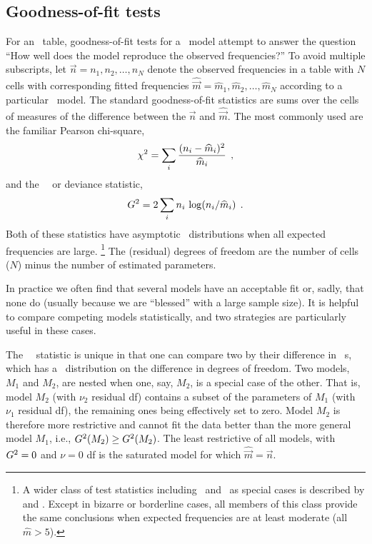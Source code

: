 \subsection{Goodness-of-fit tests} \label{sec:loglin-goodfit}

For an \nway\ table, goodness-of-fit tests for a \loglin\ model
attempt to answer the question ``How well does the model reproduce
the observed frequencies?''
To avoid multiple subscripts, let $\vec{n} = n_1, n_2, \ldots , n_N$ denote
the observed frequencies in a table with $N$ cells
with corresponding fitted frequencies
$\widehat{\vec{m}} = \widehat{m}_1, \widehat{m}_2, \ldots , \widehat{m}_N$
according to a particular \loglin\ model.
The standard goodness-of-fit statistics are sums over the cells
of measures of the difference between the $\vec{n}$ and $\widehat{\vec{m}}$.
The most commonly used are the familiar Pearson chi-square,
\begin{equation*}%
\chisq = \sum_i \frac{( n_i - \widehat{m}_i )^2}{\widehat{m}_i}
\comma
\end{equation*}
and the \LR\ \GSQ\ or deviance statistic,
\begin{equation}\label{eq:pgsq}
G^2 =  2 \sum_i n_i \, \log ( n_i / \widehat{m}_i )
\:\: .
\end{equation}
Both of these statistics have asymptotic \chisq\
distributions when all expected frequencies are large.%
\footnote{A wider class of test statistics including \chisq\
and \GSQ\ as special cases is
described by \citet{CressieRead:84} and \citet{ReadCressie:88}.
Except in bizarre or borderline
cases, all members of this class provide the same conclusions when 
expected frequencies are at least moderate (all $\widehat{m} > 5$).}
The (residual) degrees of freedom are the number of cells ($N$) minus the
number of estimated parameters.

In practice we often find that several models have an acceptable fit
or, sadly, that none do (usually because we are ``blessed'' with a
large sample size).
It is helpful to compare competing models statistically,
and two strategies are particularly useful in these cases.

The \LR\ \GSQ\ statistic is unique in that one can compare two
 by their difference in \GSQ\ s,
which has a \chisq\ distribution on the difference in degrees of
freedom.
Two models, $M_1$ and $M_2$, are nested when one, say, $M_2$, is
a special case of the other.  That is, model $M_2$ (with $\nu_2$ residual df)
contains a subset of
the parameters of $M_1$ (with $\nu_1$ residual df),
the remaining ones being effectively set to zero.
Model $M_2$ is therefore more restrictive and cannot fit the data better
than the more general model $M_1$, i.e., $G^2 (M_2) \ge G^2 (M_2)$.
The least restrictive of all models, with $G^2 = 0$ and $\nu=0$ df is
the saturated model for which $\widehat{\vec{m}} = \vec{n}$.

